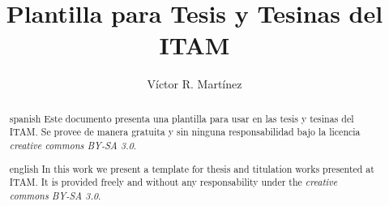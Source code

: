 \documentclass{tesisITAM}
\title{Plantilla para Tesis y Tesinas del ITAM}
\author{Víctor R. Martínez}
\begin{document}
	\maketitle
	\publicationrights


	\begin{abstract}{spanish}
		Este documento presenta una plantilla para usar en las tesis y tesinas del ITAM. Se provee de manera gratuita y sin ninguna responsabilidad bajo la licencia \emph{creative commons BY-SA 3.0}.
	\end{abstract}

	\begin{abstract}{english}
		In this work we present a template for thesis and titulation works presented at ITAM. It is provided freely and without any responsability under the \emph{creative commons BY-SA 3.0}. 
	\end{abstract}


	\setcounter{page}{1}

	\tableofcontents
	\listoffigures
	\listoftables
	\newpage

	\setcounter{page}{1}


	





	\appendix

	\clearpage
	

	
	 
\end{document}
